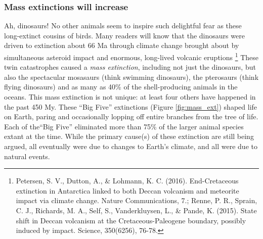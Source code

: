 \subsubsection{Mass extinctions will increase}
Ah, dinosaurs! No other animals seem to inspire such delightful fear as these long-extinct cousins of birds. Many readers will know that the dinosaurs were driven to extinction about 66 Ma through climate change brought about by simultaneous asteroid impact and enormous, long-lived volcanic eruptions \footnote{Petersen, S. V., Dutton, A., \& Lohmann, K. C. (2016). End-Cretaceous extinction in Antarctica linked to both Deccan volcanism and meteorite impact via climate change. Nature Communications, 7.; Renne, P. R., Sprain, C. J., Richards, M. A., Self, S., Vanderkluysen, L., \& Pande, K. (2015). State shift in Deccan volcanism at the Cretaceous-Paleogene boundary, possibly induced by impact. Science, 350(6256), 76-78.} These twin catastrophes caused a \emph{mass extinction}, including not just the dinosaurs, but also the spectacular mosasaurs (think swimming dinosaurs), the pterosaurs (think flying dinosaurs) and as many as 40\% of the shell-producing animals in the oceans. This mass extinction is not unique: at least four others have happened in the past 450 My. These ``Big Five'' extinctions (Figure \ref{fig:mass_ext}) shaped life on Earth, paring and occasionally lopping off entire branches from the tree of life. Each of the``Big Five'' eliminated more than 75\% of the larger animal species extant at the time. While the primary cause(s) of these extinction are still being argued, all eventually were due to changes to Earth's climate, and all were due to natural events.\\ 

